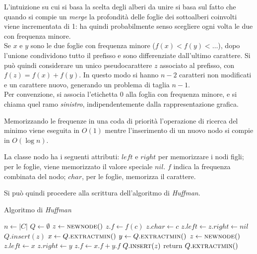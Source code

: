L'intuizione su cui si basa la scelta degli alberi da unire si basa sul fatto che quando si compie un \emph{merge} la profondità delle foglie dei sottoalberi coinvolti viene incrementata di 1: ha quindi probabilmente senso scegliere ogni volta le due con frequenza minore.
\\
Se $x$ e $y$ sono le due foglie con frequenza minore ($f(x)<f(y)<\dots$), dopo l'unione condividono tutto il prefisso e sono differenziate dall'ultimo carattere. Si può quindi considerare un unico pseudocarattere $z$ associato al prefisso, con $f(z) = f(x)+f(y)$. In questo modo si hanno $n-2$ caratteri non modificati e un carattere nuovo, generando un problema di taglia $n-1$.
\\
Per convenzione, si associa l'etichetta $0$ alla foglia con frequenza minore, e si chiama quel ramo \emph{sinistro}, indipendentemente dalla rappresentazione grafica.

Memorizzando le frequenze in una coda di priorità l'operazione di ricerca del minimo viene eseguita in $O(1)$ mentre l'inserimento di un nuovo nodo si compie in $O(\log n)$.

La classe nodo ha i seguenti attributi: $left$ e $right$ per memorizzare i nodi figli; per le foglie, viene memorizzato il valore speciale $nil$. $f$ indica la frequenza combinata del nodo; $char$, per le foglie, memorizza il carattere.

Si può quindi procedere alla scrittura dell'algoritmo di \emph{Huffman}.

\begin{algorithm}[H]
\caption{Algoritmo di \emph{Huffman}}\label{alg:huff}
\begin{algorithmic}[1]
        \State $n \gets |C|$
        \State $Q \gets \emptyset$
            \State $z \gets \Call{newnode}{ }$
            \State $z.f \gets f(c)$
            \State $z.char \gets c$
            \State $z.left \gets z.right \gets nil$
            \State $Q.insert(z)$
        \EndFor
            \State $x \gets Q.\Call{extractmin}{ }$
            \State $y \gets Q.\Call{extractmin}{ }$
            \State $z \gets \Call{newnode}{ }$
            \State $z.left \gets x$
            \State $z.right \gets y$
            \State $z.f \gets x.f + y.f$
            \State $Q.\Call{insert}{z}$
        \EndFor
        \State return $Q.\Call{extractmin}{ }$
    \EndProcedure
\end{algorithmic}
\end{algorithm}

